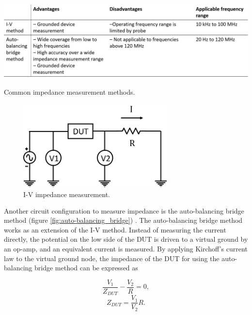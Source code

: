  \begin{table}[ht]
    \centering
    \includegraphics[width=\textwidth]{images/impedanceMeasurementMethods.png}
    \caption[Common impedance measurement methods.]{Common impedance measurement methods. \cite{keysight_technologies_impedance_2015}}
    \label{tab:z_measurement_methods}
 \end{table}
 
 \begin{figure}[ht]
    \centering
    \includegraphics[width=0.7\textwidth]{images/I-VMethod.png}
    \caption[I-V impedance measurement configuration.]{I-V impedance measurement.}
    \label{fig:IV_impedance_measurement}
\end{figure}

\par Another circuit configuration to measure impedance is the auto-balancing bridge method (figure \ref{fig:auto-balancing_bridge}) \cite{keysight_technologies_impedance_2015}. The auto-balancing bridge method works as an extension of the I-V method. Instead of measuring the current directly, the potential on the low side of the DUT is driven to a virtual ground by an op-amp, and an equivalent current is measured. By applying Kirchoff's current law to the virtual ground node, the impedance of the DUT for using the auto-balancing bridge method can be expressed as

\begin{equation}
    \frac{V_1}{Z_{DUT}} - \frac{V_2}{R} = 0,
\end{equation}
\begin{equation}
    Z_{DUT} = \frac{V_1}{V_2}R.
\end{equation}

